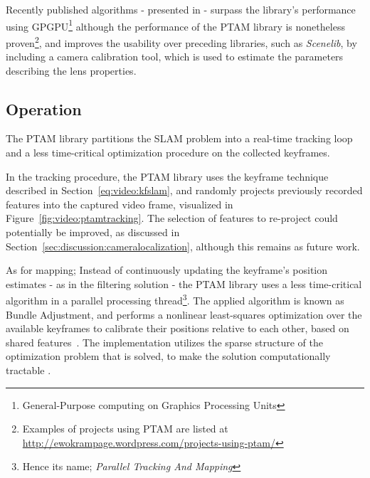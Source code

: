         Recently published algorithms - presented in \citep{Newcombe2011} - surpass
        the library's performance using GPGPU\footnote{General-Purpose computing on Graphics Processing Units}
        although the performance of the PTAM library is nonetheless proven\footnote{Examples of projects using PTAM are listed at \url{http://ewokrampage.wordpress.com/projects-using-ptam/}},
        and improves the usability over preceding libraries, such as \textit{Scenelib}, by including
        a camera calibration tool, which is used to estimate the parameters describing the lens properties.

        \subsection{Operation}
            The PTAM library partitions the SLAM problem into a real-time tracking
            loop and a less time-critical optimization procedure on the collected keyframes.

            In the tracking procedure, the PTAM library uses the keyframe
            technique described in Section~\ref{eq:video:kfslam}, and randomly projects
            previously recorded features into the captured video frame,
            visualized in Figure~\ref{fig:video:ptamtracking}.
            The selection of features to re-project could potentially be
            improved, as discussed in Section~\ref{sec:discussion:cameralocalization},
            although this remains as future work.

            As for mapping; Instead of continuously updating the keyframe's position estimates - as in the filtering solution -
            the PTAM library uses a less time-critical algorithm in a parallel processing thread\footnote{Hence its name; \textit{Parallel Tracking And Mapping}}.
            The applied algorithm is known as Bundle Adjustment, and
            performs a nonlinear least-squares optimization over the available keyframes
            to calibrate their positions relative to each other, based on shared features~\citep{lour09}.
            The implementation utilizes the sparse structure of the optimization problem that
            is solved, to make the solution computationally tractable \citep{Lourakis11bundle}.

